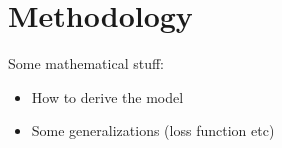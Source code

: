 \chapter{Methodology}

Some mathematical stuff:

\begin{itemize}
  \item How to derive the model
  \item Some generalizations (loss function etc)
\end{itemize}